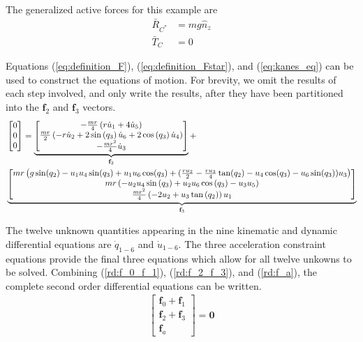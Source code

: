 \documentclass[smallcondensed,final]{svjour3}                     %
\begin{document}
The generalized active forces for this example are
\begin{align}
    \bar{R}_{C^*} &= m g \hat{n}_z \\
    \bar{T}_C &= 0
\end{align}

Equations (\ref{eq:definition_F}), (\ref{eq:definition_Fstar}), and
(\ref{eq:kanes_eq}) can be used to construct the equations of motion.
For brevity, we omit the results of each step involved, and only write the
results, after they have been partitioned into the $\mathbf{f}_2$ and
$\mathbf{f}_3$ vectors.
\begin{align}
    \label{rd:f_2_f_3}
    & \left[\begin{matrix} 0\\ 0\\ 0\end{matrix}\right] =
    \underbrace{\left[\begin{matrix}- \frac{m r}{4} \left(r \dot{u}_{1} + 4
                \dot{u}_{5}\right)\\\frac{m r}{2} \left(- r \dot{u}_{2} + 2
                \sin\left(q_{3}\right) \dot{u}_{6} + 2 \cos\left(q_{3}\right)
                \dot{u}_{4}\right)\\- \frac{m r^{2}}{4}
                \dot{u}_{3}\end{matrix}\right]}_{\mathbf{f}_2} + \notag\\
    &\underbrace{\left[\begin{matrix}
                m r \left( g \sin(q_2) - u_1 u_4 \sin(q_3) + u_1 u_6 \cos(q_3)
                    + (\frac{r u_2}{2} - \frac{r u_3}{4} \tan(q_2) - u_4
                \cos(q_3) - u_6 \sin(q_3)) u_3 \right)
                \\m r \left(- u_{2} u_{4}
                \sin\left(q_{3}\right) + u_{2} u_{6}
                \cos\left(q_{3}\right) - u_{3} u_{5}\right)\\\frac{m r^{2}}{4}
                \left(- 2 u_{2} + u_{3} \tan\left(q_{2}\right)\right)
                u_{1}\end{matrix}\right]}_{\mathbf{f}_3} 
\end{align}

The twelve unknown quantities appearing in the nine kinematic and dynamic
differential equations are $\dot{q}_{1-6}$ and $\dot{u}_{1-6}$. The three
acceleration constraint equations provide the final three equations which allow
for all twelve unkowns to be solved. Combining (\ref{rd:f_0_f_1}),
(\ref{rd:f_2_f_3}), and (\ref{rd:f_a}), the complete second order differential
equations can be written.
\begin{align}
\label{rd:ode}
\begin{bmatrix} \mathbf{f}_0 + \mathbf{f}_1\\
                \mathbf{f}_2 + \mathbf{f}_3\\
                \mathbf{f}_a \end{bmatrix} = \mathbf{0}
\end{align}
\end{document}
